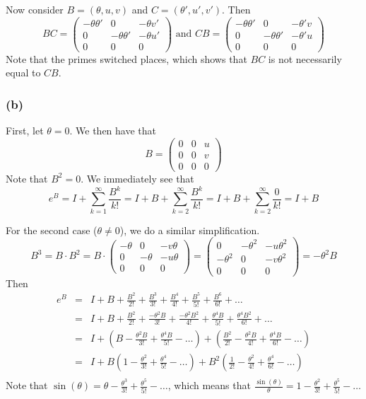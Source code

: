 \documentclass{article}
\begin{document}
Now consider $B = (\theta, u, v)$ and $C = (\theta', u', v')$.  Then 
\[
BC = 
\left(\begin{array}{ccc}
  -\theta\theta' & 0 & -\theta v'\\
  0 & -\theta \theta' & -\theta u' \\
  0 & 0 & 0 
\end{array}\right)  \text{ and }
CB = 
\left(\begin{array}{ccc}
  -\theta\theta' & 0 & -\theta' v\\
  0 & -\theta \theta' & -\theta' u \\
  0 & 0 & 0 
\end{array}\right)
\]
Note that the primes switched places, which shows that $BC$ is not necessarily equal to $CB$.

\subsubsection{(b)}
First, let $\theta = 0$. We then have that 
\[ B = 
\left(\begin{array}{ccc}
  0 & 0 & u \\
  0 & 0 & v \\
  0 & 0 & 0 
\end{array}\right) 
\]
Note that $B^2 = 0$. We immediately see that 
\[ e^B = I + \sum_{k=1}^\infty \frac{B^k}{k!} = 
         I + B + \sum_{k=2}^\infty \frac{B^k}{k!} =
         I + B + \sum_{k=2}^\infty \frac{0}{k!} = I + B
\]

For the second case ($\theta \neq 0$), we do a similar simplification.
\[
B^3 = B\cdot B^2 = B \cdot 
\left(\begin{array}{ccc}
  -\theta & 0 & -v\theta \\
  0 & -\theta & -u\theta \\
  0 & 0 & 0 
\end{array}\right) 
=
\left(\begin{array}{ccc}
  0 & -\theta ^2 & -u\theta^2 \\
  -\theta^2 & 0 & -v\theta^2 \\
  0 & 0 & 0 
\end{array}\right) 
= -\theta^2 B
\]
Then
\begin{eqnarray*}
  e^B &=&  I + B + \frac{B^2}{2!} + \frac{B^3}{3!} + \frac{B^4}{4!} + \frac{B^5}{5!} + \frac{B^6}{6!} + \dots \\
  &=&  I + B + \frac{B^2}{2!} + \frac{-\theta^2 B}{3!} + \frac{-\theta^2 B^2}{4!} + \frac{\theta^4 B}{5!} + \frac{\theta^4 B^2}{6!} + \dots \\
  &=&  I + \left(B - \frac{\theta^2 B}{3!} + \frac{\theta^4 B}{5!} - \dots \right) + 
           \left(\frac{B^2}{2!} - \frac{\theta^2 B}{4!} + \frac{\theta^4 B}{6!} - \dots \right)\\
  &=&  I + B \left(1 - \frac{\theta^2}{3!} + \frac{\theta^4}{5!} - \dots \right) + 
           B^2\left(\frac{1}{2!} - \frac{\theta^2}{4!} + \frac{\theta^4}{6!} - \dots \right)\\
\end{eqnarray*}
Note that $\sin(\theta) = \theta - \frac{\theta^3}{3!} + \frac{\theta^5}{5!} - \dots $,
which means that $\frac{\sin(\theta)}{\theta} = 1 - \frac{\theta^2}{3!} + \frac{\theta^5}{5!} - \dots $
\end{document}
